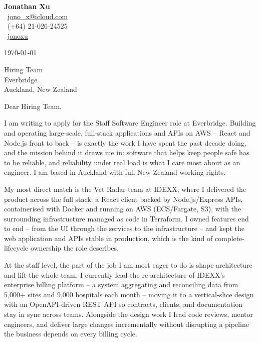 \documentclass[11pt,a4paper]{article}
\begin{document}
\begin{flushright}
{\Large\textbf{Jonathan Xu}}\\[0.3em]
\faEnvelope\ \href{mailto:jono_x@icloud.com}{jono\_x@icloud.com} \\
\faPhone\ (+64) 21-026-24525 \\
\faLinkedin\ \href{https://www.linkedin.com/in/jonathan-x-4aba55115}{jonoxu}
\end{flushright}

\vspace{0.5em}

\today

\vspace{0.5em}

Hiring Team \\
Everbridge \\
Auckland, New Zealand

\vspace{0.5em}

Dear Hiring Team,

I am writing to apply for the Staff Software Engineer role at Everbridge. Building and operating large-scale, full-stack applications and APIs on AWS -- React and Node.js front to back -- is exactly the work I have spent the past decade doing, and the mission behind it draws me in: software that helps keep people safe has to be reliable, and reliability under real load is what I care most about as an engineer. I am based in Auckland with full New Zealand working rights.

My most direct match is the Vet Radar team at IDEXX, where I delivered the product across the full stack: a React client backed by Node.js/Express APIs, containerised with Docker and running on AWS (ECS/Fargate, S3), with the surrounding infrastructure managed as code in Terraform. I owned features end to end -- from the UI through the services to the infrastructure -- and kept the web application and APIs stable in production, which is the kind of complete-lifecycle ownership the role describes.

At the staff level, the part of the job I am most eager to do is shape architecture and lift the whole team. I currently lead the re-architecture of IDEXX's enterprise billing platform -- a system aggregating and reconciling data from 5,000+ sites and 9,000 hospitals each month -- moving it to a vertical-slice design with an OpenAPI-driven REST API so contracts, clients, and documentation stay in sync across teams. Alongside the design work I lead code reviews, mentor engineers, and deliver large changes incrementally without disrupting a pipeline the business depends on every billing cycle.
\end{document}
